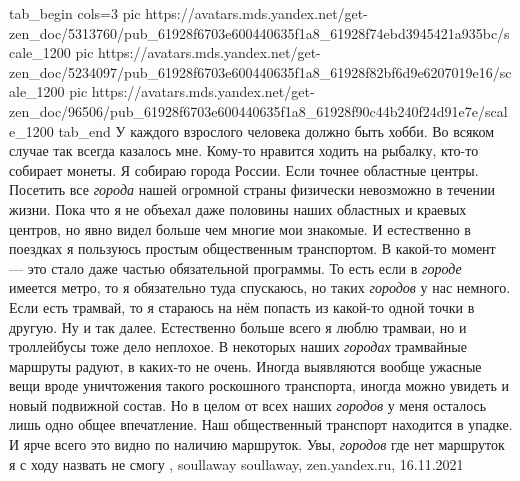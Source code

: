 \ifcmt
  tab_begin cols=3
     pic https://avatars.mds.yandex.net/get-zen_doc/5313760/pub_61928f6703e600440635f1a8_61928f74ebd3945421a935bc/scale_1200
     pic https://avatars.mds.yandex.net/get-zen_doc/5234097/pub_61928f6703e600440635f1a8_61928f82bf6d9e6207019e16/scale_1200
		 pic https://avatars.mds.yandex.net/get-zen_doc/96506/pub_61928f6703e600440635f1a8_61928f90c44b240f24d91e7e/scale_1200
  tab_end
\fi
У каждого взрослого человека должно быть хобби. Во всяком случае так всегда
казалось мне. Кому-то нравится ходить на рыбалку, кто-то собирает монеты. Я
собираю города России. Если точнее областные центры. Посетить все \emph{города} нашей
огромной страны физически невозможно в течении жизни. Пока что я не объехал
даже половины наших областных и краевых центров, но явно видел больше чем
многие мои знакомые. И естественно в поездках я пользуюсь простым общественным
транспортом. В какой-то момент — это стало даже частью обязательной программы.
То есть если в \emph{городе} имеется метро, то я обязательно туда спускаюсь, но таких
\emph{городов} у нас немного. Если есть трамвай, то я стараюсь на нём попасть из
какой-то одной точки в другую. Ну и так далее. Естественно больше всего я люблю
трамваи, но и троллейбусы тоже дело неплохое. В некоторых наших \emph{городах}
трамвайные маршруты радуют, в каких-то не очень. Иногда выявляются вообще
ужасные вещи вроде уничтожения такого роскошного транспорта, иногда можно
увидеть и новый подвижной состав. Но в целом от всех наших \emph{городов} у меня
осталось лишь одно общее впечатление. Наш общественный транспорт находится в
упадке. И ярче всего это видно по наличию маршруток. Увы, \emph{городов} где нет
маршруток я с ходу назвать не смогу
, 
soullaway soullaway, zen.yandex.ru, 16.11.2021


